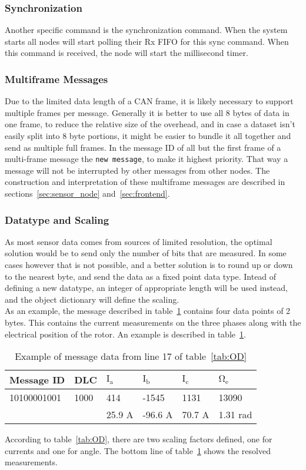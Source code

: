\subsubsection*{Synchronization}
Another specific command is the synchronization command. 
When the system starts all nodes will start polling their Rx FIFO for this sync command. 
When this command is received, the node will start the millisecond timer.

\subsubsection*{Multiframe Messages}
Due to the limited data length of a CAN frame, it is likely necessary to support multiple frames per message. 
Generally it is better to use all 8 bytes of data in one frame, to reduce the relative size of the overhead, and in case a dataset isn't easily split into 8 byte portions, it might be easier to bundle it all together and send as multiple full frames. 
In the message ID of all but the first frame of a multi-frame message the \texttt{new message}, to make it highest priority.
That way a message will not be interrupted by other messages from other nodes.
The construction and interpretation of these multiframe messages are described in sections~\ref{sec:sensor_node} and~\ref{sec:frontend}.

\subsubsection*{Datatype and Scaling}
As most sensor data comes from sources of limited resolution, the optimal solution would be to send only the number of bits that are measured. 
In some cases however that is not possible, and a better solution is to round up or down to the nearest byte, and send the data as a fixed point data type.
Intead of defining a new datatype, an integer of appropriate length will be used instead, and the object dictionary will define the scaling. \\

As an example, the message described in table~\ref{tab:message17_OD} contains four data points of 2 bytes. 
This contains the current measurements on the three phases along with the electrical position of the rotor.
An example is described in table~\ref{tab:message17_OD}.

\begin{table}
	\centering
	\begin{tabular}{l|l|l|l|l|l}
		Message ID & DLC & $\mathrm{I_a}$ & $\mathrm{I_b}$ & $\mathrm{I_c}$ & $\mathrm{\Omega _e}$ \\ 
		\hline
		10100001001 & 1000 & 414 & -1545 & 1131 & 13090 \\
		\hline
		 & & 25.9 A & -96.6 A & 70.7 A & 1.31 rad
	\end{tabular}
	\caption{Example of message data from line 17 of table~\ref{tab:OD}}
	\label{tab:message17_OD}
\end{table}
According to table~\ref{tab:OD}, there are two scaling factors defined, one for currents and one for angle. 
The bottom line of table~\ref{tab:message17_OD} shows the resolved measurements.
